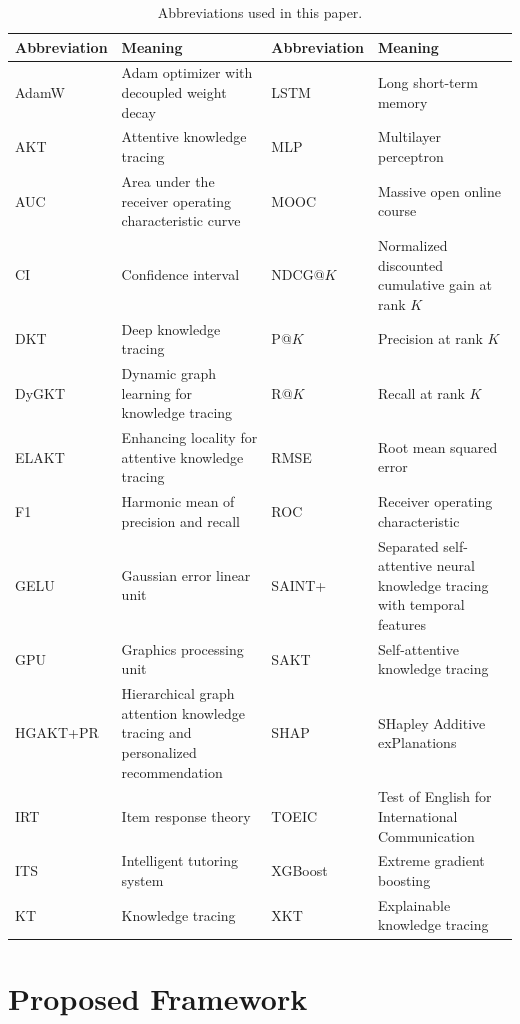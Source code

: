 \documentclass[11pt]{article}
\begin{document}
\begin{table}[t]
\centering
\caption{Abbreviations used in this paper.}
\label{tab:abbrev}
\small
\begin{tabularx}{\linewidth}{@{}lX@{\hspace{1em}}lX@{}}
\toprule
Abbreviation & Meaning & Abbreviation & Meaning \\
\midrule
AdamW & Adam optimizer with decoupled weight decay & LSTM & Long short-term memory \\
AKT & Attentive knowledge tracing & MLP & Multilayer perceptron \\
AUC & Area under the receiver operating characteristic curve & MOOC & Massive open online course \\
CI & Confidence interval & NDCG@$K$ & Normalized discounted cumulative gain at rank $K$ \\
DKT & Deep knowledge tracing & P@$K$ & Precision at rank $K$ \\
DyGKT & Dynamic graph learning for knowledge tracing & R@$K$ & Recall at rank $K$ \\
ELAKT & Enhancing locality for attentive knowledge tracing & RMSE & Root mean squared error \\
F1 & Harmonic mean of precision and recall & ROC & Receiver operating characteristic \\
GELU & Gaussian error linear unit & SAINT+ & Separated self-attentive neural knowledge tracing with temporal features \\
GPU & Graphics processing unit & SAKT & Self-attentive knowledge tracing \\
HGAKT+PR & Hierarchical graph attention knowledge tracing and personalized recommendation & SHAP & SHapley Additive exPlanations \\
IRT & Item response theory & TOEIC & Test of English for International Communication \\
ITS & Intelligent tutoring system & XGBoost & Extreme gradient boosting \\
KT & Knowledge tracing & XKT & Explainable knowledge tracing \\
\bottomrule
\end{tabularx}
\end{table}

\section{Proposed Framework}\label{sec:method}
\end{document}
